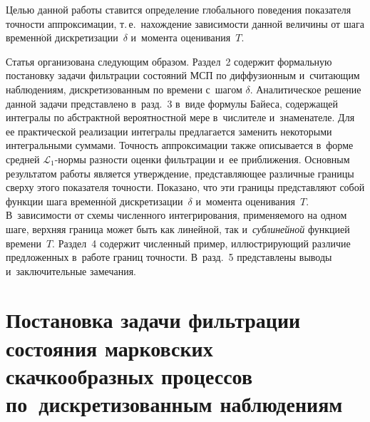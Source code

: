 \begin{multicols}{2}
 Целью данной работы ставится определение глобального поведения показателя 
точ\-ности аппроксимации, т.\,е.\ нахождение за\-ви\-си\-мости данной величины от шага 
временн$\acute{\mbox{о}}$й дискретизации~$\delta$ и~момента оценивания~$T$.

 Статья организована следующим образом. Раздел~2 содержит формальную постановку 
задачи фильт\-ра\-ции со\-сто\-яний МСП по диффузионным и~счи\-та\-ющим наблюдениям, 
дискретизованным по времени с~шагом $\delta$. Аналитическое решение данной 
задачи пред\-став\-ле\-но в~разд.~3 в~виде формулы Байеса, содержащей интегралы по 
абстрактной вероятностной мере в~чис\-ли\-те\-ле и~знаменателе. Для ее практической 
реализации интегралы предлагается заменить некоторыми интегральными суммами. 
Точ\-ность аппроксимации так\-же описывается в~форме сред\-ней $\mathcal{L}_1$-нор\-мы 
раз\-ности оценки фильт\-ра\-ции и~ее при\-бли\-же\-ния. Основным результатом работы 
является утверж\-де\-ние,
пред\-став\-ля\-ющее различные границы сверху этого показателя точ\-ности. Показано, что
эти границы пред\-став\-ля\-ют собой функции шага временн$\acute{\mbox{о}}$й дискретизации~$\delta$ 
и~момента оценивания~$T$. В~за\-ви\-си\-мости от схемы чис\-лен\-но\-го интегрирования, 
при\-ме\-ня\-емо\-го на одном шаге, верх\-няя граница может быть как линейной, так и~\textit{сублинейной} функцией времени~$T$.
Раздел~4 содержит чис\-лен\-ный пример, ил\-лю\-ст\-ри\-ру\-ющий различие предложенных 
в~работе границ точ\-ности. В~разд.~5 пред\-став\-ле\-ны выводы и~заключительные 
замечания.

  \section{Постановка задачи фильтрации состояния марковских скачкообразных процессов по~дискретизованным 
наблюдениям}


\end{multicols}
